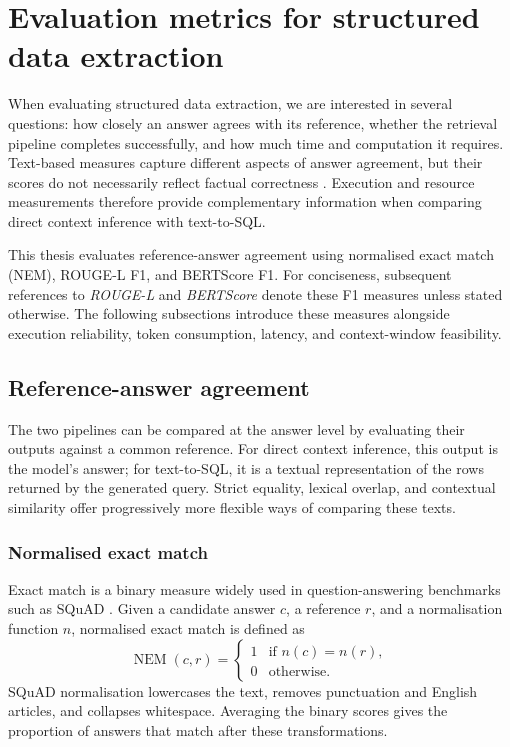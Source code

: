 \section{Evaluation metrics for structured data extraction} \label{sec:evaluation-metrics-background}

When evaluating structured data extraction, we are interested in several questions: how closely an answer
agrees with its reference, whether the retrieval pipeline completes successfully, and how much time and
computation it requires. Text-based measures capture different aspects of answer agreement, but their scores
do not necessarily reflect factual correctness \cite{novikova2017we}. Execution and resource measurements
therefore provide complementary information when comparing direct context inference with text-to-SQL.

This thesis evaluates reference-answer agreement using normalised exact match (NEM), ROUGE-L F1, and
BERTScore F1. For conciseness, subsequent references to \emph{ROUGE-L} and \emph{BERTScore} denote these F1
measures unless stated otherwise. The following subsections introduce these measures alongside execution
reliability, token consumption, latency, and context-window feasibility.

\subsection{Reference-answer agreement} \label{sec:reference-answer-metrics}

The two pipelines can be compared at the answer level by evaluating their outputs against a common reference.
For direct context inference, this output is the model's answer; for text-to-SQL, it is a textual
representation of the rows returned by the generated query. Strict equality, lexical overlap, and contextual
similarity offer progressively more flexible ways of comparing these texts.

\subsubsection{Normalised exact match}

Exact match is a binary measure widely used in question-answering benchmarks such as SQuAD
\cite{rajpurkar2016squad}. Given a candidate answer $c$, a reference $r$, and a normalisation function $n$,
normalised exact match is defined as
\begin{equation}   \operatorname{NEM}(c,r) =
  \begin{cases} \num{1} & \text{if } n(c) = n(r), \\ \num{0} & \text{otherwise.}
  \end{cases}
\end{equation}
SQuAD normalisation lowercases the text, removes punctuation and English articles, and collapses whitespace.
Averaging the binary scores gives the proportion of answers that match after these transformations.


